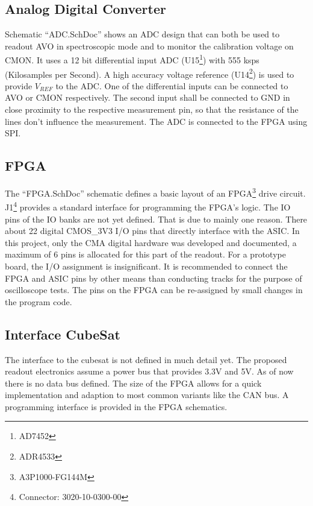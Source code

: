 \subsection{Analog Digital Converter}
\label{sec:adc}
Schematic ``ADC.SchDoc'' shows an ADC design that can both be used to readout AVO in spectroscopic mode and to monitor the calibration voltage on CMON.
It uses a 12 bit differential input ADC (U15\footnote{AD7452}) with 555 ksps (Kilosamples per Second).
A high accuracy voltage reference (U14\footnote{ADR4533}) is used to provide $V_{REF}$ to the ADC.
One of the differential inputs can be connected to AVO or CMON respectively.
The second input shall be connected to GND in close proximity to the respective measurement pin, so that the resistance of the lines don't influence the measurement.
The ADC is connected to the FPGA using SPI.

\subsection{FPGA}
\label{sec:FPGA}
The ``FPGA.SchDoc'' schematic defines a basic layout of an FPGA\footnote{A3P1000-FG144M} drive circuit.
J1\footnote{Connector: 3020-10-0300-00} provides a standard interface for programming the FPGA's logic.
The IO pins of the IO banks are not yet defined. That is due to mainly one reason. There about 22 digital CMOS\_3V3  I/O pins that directly interface with the ASIC. In this project, only the CMA digital hardware was developed and documented, a maximum of 6 pins is allocated for this part of the readout. For a prototype board, the I/O assignment is insignificant. It is recommended to connect the FPGA and ASIC pins by other means than conducting tracks for the purpose of oscilloscope tests. The pins on the FPGA can be re-assigned by small changes in the program code.

\subsection{Interface CubeSat}
\label{sec:interface_cubesat}
The interface to the cubesat is not defined in much detail yet.
The proposed readout electronics assume a power bus that provides 3.3V and 5V.
As of now there is no data bus defined.
The size of the FPGA allows for a quick implementation and adaption to most common variants like the CAN bus.
A programming interface is provided in the FPGA schematics.
